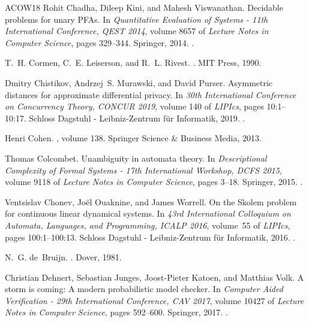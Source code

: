 \documentclass[10pt,a4paper]{amsart}
\numberwithin{equation}{section}
\theoremstyle{plain}
\theoremstyle{definition}
\theoremstyle{remark}
\begin{document}
\begin{thebibliography}{ACOW18}
Rohit Chadha, Dileep Kini, and Mahesh Viswanathan.
\newblock Decidable problems for unary {PFA}s.
\newblock In {\em Quantitative Evaluation of Systems - 11th International
  Conference, {QEST} 2014}, volume 8657 of {\em Lecture Notes in Computer
  Science}, pages 329--344. Springer, 2014.
\newblock \href {https://doi.org/10.1007/978-3-319-10696-0_26}
  {}.

T.~H. Cormen, C.~E. Leiserson, and R.~L. Rivest.
.
\newblock MIT Press, 1990.

Dmitry Chistikov, Andrzej~S. Murawski, and David Purser.
\newblock Asymmetric distances for approximate differential privacy.
\newblock In {\em 30th International Conference on Concurrency Theory, {CONCUR}
  2019}, volume 140 of {\em LIPIcs}, pages 10:1--10:17. Schloss Dagstuhl -
  Leibniz-Zentrum f{\"{u}}r Informatik, 2019.
\newblock \href {https://doi.org/10.4230/LIPIcs.CONCUR.2019.10}
  {}.

Henri Cohen.
, volume 138.
\newblock Springer Science \& Business Media, 2013.

Thomas Colcombet.
\newblock Unambiguity in automata theory.
\newblock In {\em Descriptional Complexity of Formal Systems - 17th
  International Workshop, {DCFS} 2015}, volume 9118 of {\em Lecture Notes in
  Computer Science}, pages 3--18. Springer, 2015.
\newblock \href {https://doi.org/10.1007/978-3-319-19225-3_1}
  {}.

Ventsislav Chonev, Jo{\"{e}}l Ouaknine, and James Worrell.
\newblock On the {S}kolem problem for continuous linear dynamical systems.
\newblock In {\em 43rd International Colloquium on Automata, Languages, and
  Programming, {ICALP} 2016}, volume~55 of {\em LIPIcs}, pages 100:1--100:13.
  Schloss Dagstuhl - Leibniz-Zentrum f{\"{u}}r Informatik, 2016.
\newblock \href {https://doi.org/10.4230/LIPIcs.ICALP.2016.100}
  {}.

N.~G. de~Bruijn.
.
\newblock Dover, 1981.

Christian Dehnert, Sebastian Junges, Joost{-}Pieter Katoen, and Matthias Volk.
\newblock A storm is coming: {A} modern probabilistic model checker.
\newblock In {\em Computer Aided Verification - 29th International Conference,
  {CAV} 2017}, volume 10427 of {\em Lecture Notes in Computer Science}, pages
  592--600. Springer, 2017.
\newblock \href {https://doi.org/10.1007/978-3-319-63390-9_31}
  {}.


\end{thebibliography}
\end{document}
